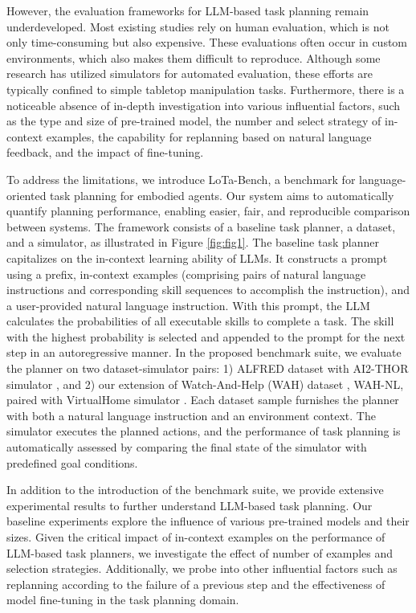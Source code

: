However, the evaluation frameworks for LLM-based task planning remain underdeveloped. Most existing studies rely on human evaluation, which is not only time-consuming but also expensive. These evaluations often occur in custom environments, which also makes them difficult to reproduce. Although some research \citep{huang2023inner, liang2023code} has utilized simulators for automated evaluation, these efforts are typically confined to simple tabletop manipulation tasks. Furthermore, there is a noticeable absence of in-depth investigation into various influential factors, such as the type and size of pre-trained model, the number and select strategy of in-context examples, the capability for replanning based on natural language feedback, and the impact of fine-tuning.

To address the limitations, we introduce LoTa-Bench, a benchmark for language-oriented task planning for embodied agents. Our system aims to automatically quantify planning performance, enabling easier, fair, and reproducible comparison between systems. The framework consists of a baseline task planner, a dataset, and a simulator, as illustrated in Figure \ref{fig:fig1}. The baseline task planner capitalizes on the in-context learning ability of LLMs. It constructs a prompt using a prefix, in-context examples (comprising pairs of natural language instructions and corresponding skill sequences to accomplish the instruction), and a user-provided natural language instruction. With this prompt, the LLM calculates the probabilities of all executable skills to complete a task. The skill with the highest probability is selected and appended to the prompt for the next step in an autoregressive manner. 
In the proposed benchmark suite, we evaluate the planner on two dataset-simulator pairs: 1) ALFRED dataset \citep{shridhar2020alfred} with AI2-THOR simulator \citep{kolve2017ai2}, and 2) our extension of Watch-And-Help (WAH) dataset \citep{puig2021watchandhelp}, WAH-NL, paired with VirtualHome simulator \citep{puig2018virtualhome}. Each dataset sample furnishes the planner with both a natural language instruction and an environment context. The simulator executes the planned actions, and the performance of task planning is automatically assessed by comparing the final state of the simulator with predefined goal conditions.

In addition to the introduction of the benchmark suite, we provide extensive experimental results to further understand LLM-based task planning. Our baseline experiments explore the influence of various pre-trained models and their sizes. Given the critical impact of in-context examples on the performance of LLM-based task planners, we investigate the effect of number of examples and selection strategies. Additionally, we probe into other influential factors such as replanning according to the failure of a previous step and the effectiveness of model fine-tuning in the task planning domain.

